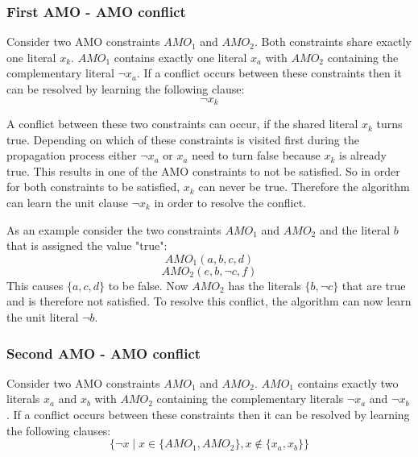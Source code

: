 \subsubsection{First AMO - AMO conflict}
\begin{leftbar}
Consider two AMO constraints $AMO_1$ and $AMO_2$. Both constraints share exactly one literal $x_k$. $AMO_1$ contains exactly one literal $x_a$ with $AMO_2$ containing the complementary literal $\neg x_a$.
If a conflict occurs between these constraints then it can be resolved by learning the following clause:
\begin{displaymath}
\neg x_k
\end{displaymath}

\end{leftbar}
A conflict between these two constraints can occur, if the shared literal $x_k$ turns true. Depending on which of these constraints is visited first during the propagation process either $\neg x_a$ or $x_a$ need to turn false because $x_k$ is already true. This results in one of the AMO constraints to not be satisfied. So in order for both constraints to be satisfied, $x_k$ can never be true. Therefore the algorithm can learn the unit clause $\neg x_k$ in order to resolve the conflict.

As an example consider the two constraints $AMO_1$ and $AMO_2$ and the literal $b$ that is assigned the value "true":
\begin{displaymath}
AMO_1(a,b,c,d)
\end{displaymath}
\begin{displaymath}
AMO_2(e,b,\neg c,f)
\end{displaymath}
This causes $\{a,c,d\}$ to be false. Now $AMO_2$ has the literals $\{b,\neg c\}$ that are true and is therefore not satisfied. To resolve this conflict, the algorithm can now learn the unit literal $\neg b$.

\subsubsection{Second AMO - AMO conflict}
\begin{leftbar}
Consider two AMO constraints $AMO_1$ and $AMO_2$. $AMO_1$ contains exactly two literals $x_a$ and $x_b$ with $AMO_2$ containing the complementary literals $\neg x_a$ and $\neg x_b$.
If a conflict occurs between these constraints then it can be resolved by learning the following clauses:
\begin{displaymath}
\{\neg x \; | \; x \in \{AMO_1,AMO_2\}, x \notin \{x_a,x_b\}\}
\end{displaymath}

\end{leftbar}


